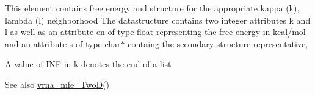 This element contains free energy and structure for the appropriate kappa (k), lambda (l) neighborhood The datastructure contains two integer attributes \textquotesingle{}k\textquotesingle{} and \textquotesingle{}l\textquotesingle{} as well as an attribute \textquotesingle{}en\textquotesingle{} of type float representing the free energy in kcal/mol and an attribute \textquotesingle{}s\textquotesingle{} of type char$\ast$ containg the secondary structure representative,

A value of \hyperlink{energy__const_8h_a12c2040f25d8e3a7b9e1c2024c618cb6}{I\+NF} in k denotes the end of a list

\begin{DoxySeeAlso}{See also}
\hyperlink{group__kl__neighborhood__mfe_ga243c288b463147352829df04de6a2f77}{vrna\+\_\+mfe\+\_\+\+Two\+D()} 
\end{DoxySeeAlso}
